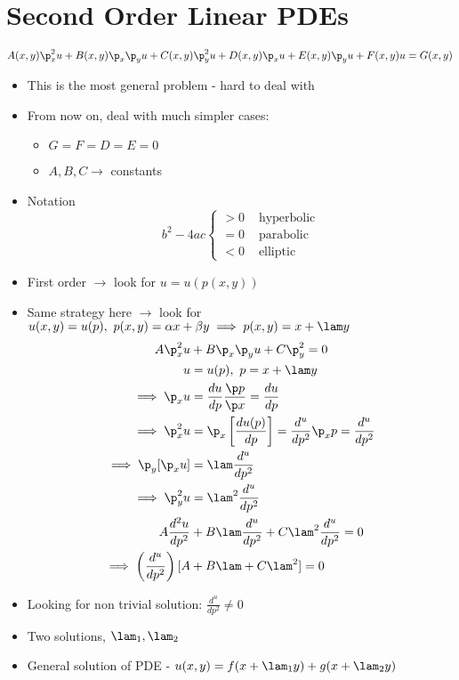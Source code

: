 \documentclass[Maths.tex]{subfiles}
\begin{document}
\section{Second Order Linear PDEs}
\begin{equation}
	A(x,y)\p_x^2u + B(x,y)\p_x\p_yu + C(x,y)\p_y^2u + D(x,y)\p_xu + E(x,y)\p_yu + F(x,y)u = G(x,y)
\end{equation}
\begin{itemize}
	\item This is the most general problem - hard to deal with
	\item From now on, deal with much simpler cases:
	\begin{itemize}
		\item $G=F=D=E=0$
		\item $A,B,C \to$ constants
	\end{itemize}
	\item Notation
	\begin{equation}
		b^2 - 4ac \begin{cases} > 0 & \text{ hyperbolic} \\ = 0 & \text{ parabolic} \\ < 0 & \text{ elliptic} \end{cases}
	\end{equation}
	\item First order $\to$ look for $u = u(p(x,y))$
	\item Same strategy here $\to$ look for $u(x,y) = u(p),~ p(x,y) = \alpha x + \beta y \implies p(x,y) = x + \lam y$
	\begin{align}
		A\p_x^2u &+ B\p_x\p_yu + C\p_y^2 = 0 \\
		u &= u(p),~ p = x + \lam y \\
		\implies \p_xu &= \frac{du}{dp}\frac{\p p}{\p x} = \frac{du}{dp} \\
		\implies \p_x^2u &= \p_x\left[\frac{du(p)}{dp}\right] = \frac{d^u}{dp^2}\p_xp = \frac{d^u}{dp^2} \\
		\implies \p_y[\p_xu] &= \lam\frac{d^u}{dp^2} \\
		\implies \p_y^2u &= \lam^2\frac{d^u}{dp^2} \\
		A\frac{d^2u}{dp^2} &+ B\lam\frac{d^u}{dp^2} + C\lam^2\frac{d^u}{dp^2} = 0 \\
		\implies \left(\frac{d^u}{dp^2}\right)[A &+ B\lam + C\lam^2] = 0
	\end{align}
	\item Looking for non trivial solution: $\frac{d^u}{dp^2} \neq 0$
	\item Two solutions, $\lam_1,\lam_2$
	\item General solution of PDE - $u(x,y) = f(x+\lam_1y) + g(x+\lam_2y)$
\end{itemize}
\end{document}
